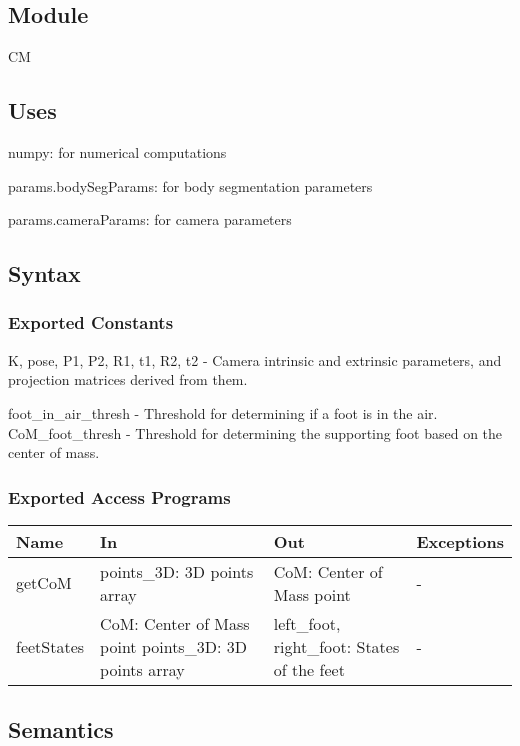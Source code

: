 \documentclass[12pt, titlepage]{article}
\begin{document}
\subsection{Module}
CM

\subsection{Uses}

\noindent numpy: for numerical computations

\noindent params.bodySegParams: for body segmentation parameters

\noindent params.cameraParams: for camera parameters

\subsection{Syntax}

\subsubsection{Exported Constants}

\noindent K, pose, P1, P2, R1, t1, R2, t2 - Camera intrinsic and extrinsic parameters, and
projection matrices derived from them.

\noindent foot\_in\_air\_thresh - Threshold for determining if a foot is in the air.
\noindent CoM\_foot\_thresh - Threshold for determining the supporting foot based on the center of mass.

\subsubsection{Exported Access Programs}
\begin{tabularx}{\textwidth}{X X X X}
  \hline
  \textbf{Name}    & \textbf{In}                                                 & \textbf{Out}                                      & \textbf{Exceptions} \\
  \hline
  getCoM     & points\_3D: 3D points array                           & CoM: Center of Mass point                   & -             \\
  feetStates & CoM: Center of Mass point points\_3D: 3D points array & left\_foot, right\_foot: States of the feet & -             \\
  \hline
\end{tabularx}

\subsection{Semantics}
\end{document}
